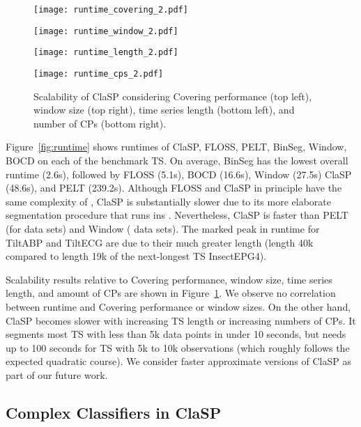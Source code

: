 \documentclass[pdflatex,sn-basic]{sn-jnl}
\begin{document}
\begin{figure}[t]
	\begin{minipage}{6cm}
        \texttt{[image: runtime\_covering\_2.pdf]}
	\end{minipage}
	\begin{minipage}{6cm}
        \texttt{[image: runtime\_window\_2.pdf]}
	\end{minipage}
	\begin{minipage}{6cm}
        \texttt{[image: runtime\_length\_2.pdf]}
	\end{minipage}
	\begin{minipage}{6cm}
        \texttt{[image: runtime\_cps\_2.pdf]}
	\end{minipage}
	\caption{Scalability of ClaSP considering Covering performance (top left), window size (top right), time series length (bottom left), and number of CPs (bottom right). \label{fig:scalability}
	}
\end{figure}

Figure~\ref{fig:runtime} shows runtimes of ClaSP, FLOSS, PELT, BinSeg, Window, BOCD on each of the  benchmark TS. On average, BinSeg has the lowest overall runtime (2.6s), followed by FLOSS (5.1s), BOCD (16.6s), Window (27.5s) ClaSP (48.6s), and PELT (239.2s). Although FLOSS and ClaSP in principle have the same complexity of , ClaSP is substantially slower due to its more elaborate segmentation procedure that runs ins . Nevertheless, ClaSP is faster than PELT (for  data sets) and Window ( data sets). The marked peak in runtime for TiltABP and TiltECG are due to their much greater length (length 40k compared to length 19k of the next-longest TS InsectEPG4). 

Scalability results relative to Covering performance, window size, time series length, and amount of CPs are shown in Figure~\ref{fig:scalability}. We observe no correlation between runtime and Covering performance or window sizes. On the other hand, ClaSP becomes slower with increasing TS length or increasing numbers of CPs. It segments most TS with less than 5k data points in under 10 seconds, but needs up to 100 seconds for TS with 5k to 10k observations (which roughly follows the expected quadratic course). We consider faster approximate versions of ClaSP as part of our future work. 


\subsection{Complex Classifiers in ClaSP} \label{sec:complex-classifiers}
\end{document}
